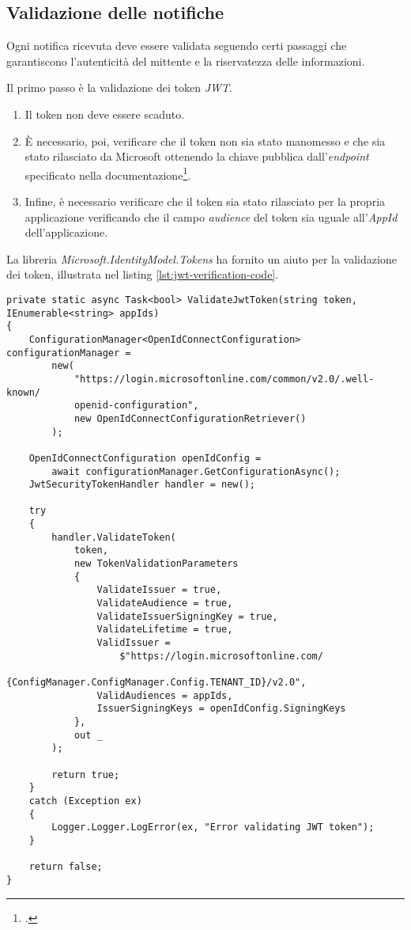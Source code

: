 \subsection{Validazione delle notifiche}

Ogni notifica ricevuta deve essere validata seguendo certi passaggi che garantiscono l'autenticità del mittente e la riservatezza delle informazioni.

\noindent Il primo passo è la validazione dei token \emph{JWT}. 
\begin{enumerate}
	\item Il token non deve essere scaduto.
	\item È necessario, poi, verificare che il token non sia stato manomesso e che sia stato rilasciato da Microsoft ottenendo la chiave pubblica dall'\emph{endpoint} specificato nella documentazione\footcite{site:rich-notification}.
	\item Infine, è necessario verificare che il token sia stato rilasciato per la propria applicazione verificando che il campo \emph{audience} del token sia uguale all'\emph{AppId} dell'applicazione.
\end{enumerate}

\noindent La libreria \emph{Microsoft.IdentityModel.Tokens} ha fornito un aiuto per la validazione dei token, illustrata nel listing \ref{lst:jwt-verification-code}.

\begin{lstlisting}[caption=Codice per la verifica della firma nei token JWT, label=lst:jwt-verification-code]
private static async Task<bool> ValidateJwtToken(string token, IEnumerable<string> appIds)
{
	ConfigurationManager<OpenIdConnectConfiguration> configurationManager =
		new(
			"https://login.microsoftonline.com/common/v2.0/.well-known/
			openid-configuration",
			new OpenIdConnectConfigurationRetriever()
		);

	OpenIdConnectConfiguration openIdConfig =
		await configurationManager.GetConfigurationAsync();
	JwtSecurityTokenHandler handler = new();

	try
	{
		handler.ValidateToken(
			token,
			new TokenValidationParameters
			{
				ValidateIssuer = true,
				ValidateAudience = true,
				ValidateIssuerSigningKey = true,
				ValidateLifetime = true,
				ValidIssuer =
					$"https://login.microsoftonline.com/
					{ConfigManager.ConfigManager.Config.TENANT_ID}/v2.0",
				ValidAudiences = appIds,
				IssuerSigningKeys = openIdConfig.SigningKeys
			},
			out _
		);

		return true;
	}
	catch (Exception ex)
	{
		Logger.Logger.LogError(ex, "Error validating JWT token");
	}

	return false;
}
\end{lstlisting}


